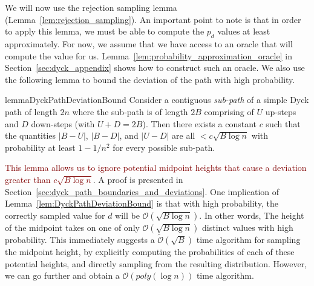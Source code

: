 We will now use the rejection sampling lemma (Lemma~\ref{lem:rejection_sampling}).
An important point to note is that in order to apply this lemma, we must be able to compute the $p_d$ values at least approximately.
For now, we assume that we have access to an oracle that will compute the value for us.
Lemma~\ref{lem:probability_approximation_oracle} in Section~\ref{sec:dyck_appendix} shows how to construct such an oracle.
We also use the following lemma to bound the deviation of the path with high probability.
\begin{restatable}{lemma}{DyckPathDeviationBound}
\label{lem:DyckPathDeviationBound}
Consider a contiguous \emph{sub-path} of a simple Dyck path of length $2n$
where the sub-path is of length $2B$ comprising of $U$ up-steps and $D$ down-steps (with $U + D = 2B$).
Then there exists a constant $c$ such that the quantities $|B-U|$, $|B-D|$, and $|U-D|$
are all $<c\sqrt{B\log n}$ with probability at least $1-1/n^2$ for every possible sub-path.
\end{restatable}
\textcolor{Maroon}{This lemma allows us to ignore potential midpoint heights that cause a deviation greater than $c \sqrt{B\log n}$}.
A proof is presented in Section~\ref{sec:dyck_path_boundaries_and_deviations}.
One implication of Lemma~\ref{lem:DyckPathDeviationBound} is that with high probability,
the correctly sampled value for $d$ will be $\mathcal O(\sqrt{B\log n})$.
In other words, The height of the midpoint takes on one of only  $\mathcal O(\sqrt{B\log n})$ distinct values with high probability.
This immediately suggests a $\tilde{\mathcal O}(\sqrt{B})$ time algorithm for sampling the midpoint height,
by explicitly computing the probabilities of each of these potential heights, and directly sampling from the resulting distribution.
However, we can go further and obtain a $\mathcal O(poly(\log n))$ time algorithm.


